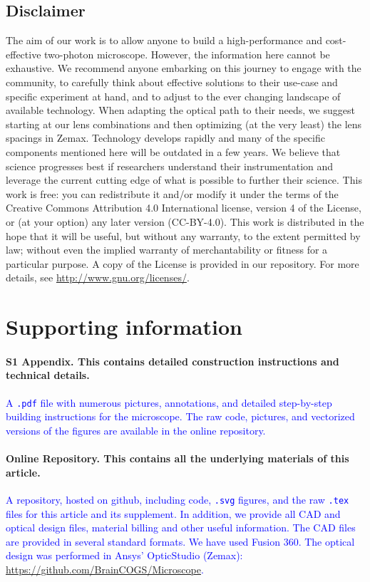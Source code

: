 \documentclass[10pt,letterpaper]{article}
\begin{document}
\subsection*{Disclaimer}
The aim of our work is to allow anyone to build a high-performance and cost-effective two-photon microscope. However, the information here cannot be exhaustive. We recommend anyone embarking on this journey to engage with the community, to carefully think about effective solutions to their use-case and specific experiment at hand, and to adjust to the ever changing landscape of available technology. When adapting the optical path to their needs, we suggest starting at our lens combinations and then optimizing (at the very least) the lens spacings in Zemax. Technology develops rapidly and many of the specific components mentioned here will be outdated in a few years. We believe that science progresses best if researchers understand their instrumentation and leverage the current cutting edge of what is possible to further their science.\newline
This work is free: you can redistribute it and/or modify it under the terms of the Creative Commons Attribution 4.0 International license, version 4 of the License, or (at your option) any later version (CC-BY-4.0). This work is distributed in the hope that it will be useful, but without any warranty, to the extent permitted by law; without even the implied warranty of merchantability or fitness for a particular purpose. A copy of the License is provided in our repository.  For more details, see \url{http://www.gnu.org/licenses/}.

\section*{Supporting information}

\paragraph*{S1 Appendix. This contains detailed construction instructions and technical details.}
\label{S1_Appendix}
\textcolor{blue}{A \texttt{.pdf} file with numerous pictures, annotations, and detailed step-by-step building instructions for the microscope. The raw code, pictures, and vectorized versions of the figures are available in the online repository.}

\paragraph*{Online Repository. This contains all the underlying materials of this article.}
\label{repository}
\textcolor{blue}{A repository, hosted on github, including code, \texttt{.svg} figures, and the raw \texttt{.tex} files for this article and its supplement. In addition, we provide all CAD and optical design files, material billing and other useful information. The CAD files are provided in several standard formats. We have used Fusion 360. The optical design was performed in Ansys' OpticStudio (Zemax): \url{https://github.com/BrainCOGS/Microscope}.}
\end{document}
